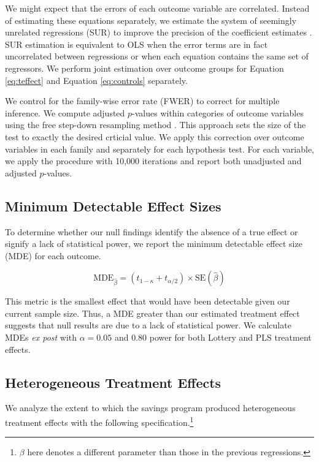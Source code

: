 \documentclass[11pt]{article}
\begin{document}
		We might expect that the errors of each outcome variable are correlated. Instead of estimating these equations separately, we estimate the system of seemingly unrelated regressions (SUR) to improve the precision of the coefficient estimates \parencite{zellner_efficient_1962}. SUR estimation is equivalent to OLS when the error terms are in fact uncorrelated between regressions or when each equation contains the same set of regressors. We perform joint estimation over outcome groups for Equation \ref{eq:teffect} and Equation \ref{eq:controls} separately.

		We control for the family-wise error rate (FWER) to correct for multiple inference. We compute adjusted $p$-values within categories of outcome variables using the free step-down resampling method \parencite{westfall_resampling-based_1993,anderson_multiple_2008}. This approach sets the size of the test to exactly the desired crticial value. We apply this correction over outcome variables in each family and separately for each hypothesis test. For each variable, we apply the procedure with 10,000 iterations and report both unadjusted and adjusted $p$-values.

	\subsection{Minimum Detectable Effect Sizes}

		To determine whether our null findings identify the absence of a true effect or signify a lack of statistical power, we report the minimum detectable effect size (MDE) for each outcome.

		\begin{equation}
			\mathrm{MDE}_{\hat \beta} = (t_{1-\kappa} + t_{\alpha/2}) \times \mathrm{SE}(\hat \beta)
		\label{eq:mde} \end{equation}

		This metric is the smallest effect that would have been detectable given our current sample size. Thus, a MDE greater than our estimated treatment effect suggests that null results are due to a lack of statistical power. We calculate MDEs \textit{ex post} with $\alpha = 0.05$ and 0.80 power for both Lottery and PLS treatment effects.

	\subsection{Heterogeneous Treatment Effects}

		We analyze the extent to which the savings program produced heterogeneous treatment effects with the following specification.\footnote{$\beta$ here denotes a different parameter than those in the previous regressions.}
\end{document}

